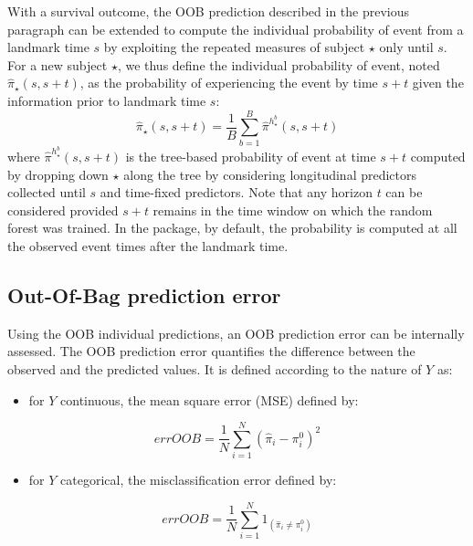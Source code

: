 With a survival outcome, the OOB prediction described in the previous paragraph can be extended to compute the individual probability of event from a landmark time \(s\) by exploiting the repeated measures of subject \(\star\) only until \(s\). For a new subject \(\star\), we thus define the individual probability of event, noted \(\hat{\pi}_{\star}(s,s+t)\), as the probability of experiencing the event by time \(s+t\) given the information prior to landmark time \(s\):
\begin{equation}
  \hat{\pi}_{\star}(s,s+t) = \frac{1}{B} \sum_{b=1}^B \hat{\pi}^{h_\star^b}(s,s+t)
\end{equation}
where \(\hat{\pi}^{h_\star^b}(s,s+t)\) is the tree-based probability of event at time \(s+t\) computed by dropping down \(\star\) along the tree by considering longitudinal predictors collected until \(s\) and time-fixed predictors. Note that any horizon \(t\) can be considered provided \(s+t\) remains in the time window on which the random forest was trained. In the  package, by default, the probability is computed at all the observed event times after the landmark time.

\subsection{Out-Of-Bag prediction error}\label{out-of-bag-prediction-error}

Using the OOB individual predictions, an OOB prediction error can be internally assessed. The OOB prediction error quantifies the difference between the observed and the predicted values. It is defined according to the nature of \(Y\) as:

\begin{itemize}
\tightlist
\item
  for \(Y\) continuous, the mean square error (MSE) defined by:
\end{itemize}

\begin{equation}
  errOOB = \frac{1}{N} \sum_{i=1}^N ( \hat{\pi}_i - \pi_i^0 )^2
\end{equation}

\begin{itemize}
\tightlist
\item
  for \(Y\) categorical, the misclassification error defined by:
\end{itemize}

\begin{equation}
  errOOB = \frac{1}{N} \sum_{i=1}^N {1}_{( \hat{\pi}_i \neq \pi_i^0 )}
\end{equation}

